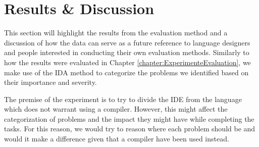 \chapter{Results \& Discussion}

This section will highlight the results from the evaluation method and a discussion of how the data can serve as a future reference to language designers and people interested in conducting their own evaluation methods. Similarly to how the results were evaluated in Chapter \ref{chapter:ExperimenteEvaluation}, we make use of the IDA method \cite{IDA} to categorize the problems we identified based on their importance and severity.

The premise of the experiment is to try to divide the IDE from the language which does not warrant using a compiler. However, this might affect the categorization of problems and the impact they might have while completing the tasks. For this reason, we would try to reason where each problem should be and would it make a difference given that a compiler have been used instead.

